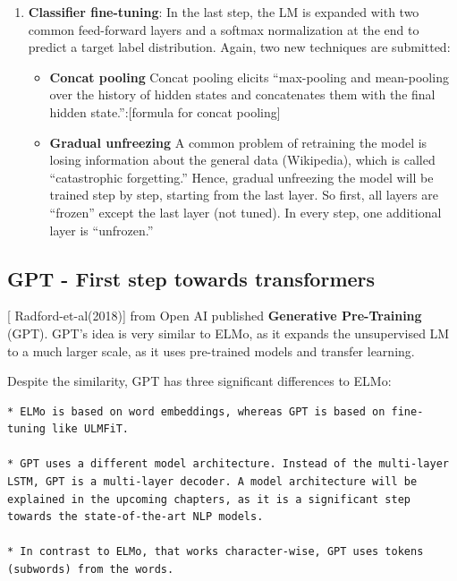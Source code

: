\documentclass[]{krantz}
\providecommand{\tightlist}{%
  \setlength{\itemsep}{0pt}\setlength{\parskip}{0pt}}
\begin{document}
\begin{enumerate}
\def\labelenumi{\arabic{enumi}.}
\setcounter{enumi}{2}
\tightlist
\item
  \textbf{Classifier fine-tuning}: In the last step, the LM is expanded with two common feed-forward layers and a softmax normalization at the end to predict a target label distribution. Again, two new techniques are submitted:

  \begin{itemize}
  \tightlist
  \item
    \textbf{Concat pooling}
    Concat pooling elicits ``max-pooling and mean-pooling over the history of hidden states and concatenates them with the final hidden state.'':{[}formula for concat pooling{]}
  \item
    \textbf{Gradual unfreezing}
    A common problem of retraining the model is losing information about the general data (Wikipedia), which is called ``catastrophic forgetting.'' Hence, gradual unfreezing the model will be trained step by step, starting from the last layer. So first, all layers are ``frozen'' except the last layer (not tuned). In every step, one additional layer is ``unfrozen.''
  \end{itemize}
\end{enumerate}

\hypertarget{gpt---first-step-towards-transformers}{%
\subsection{GPT - First step towards transformers}\label{gpt---first-step-towards-transformers}}

{[} Radford-et-al(2018){]} from Open AI published \textbf{Generative Pre-Training} (GPT). GPT's idea is very similar to ELMo, as it expands the unsupervised LM to a much larger scale, as it uses pre-trained models and transfer learning.

Despite the similarity, GPT has three significant differences to ELMo:

\begin{verbatim}
* ELMo is based on word embeddings, whereas GPT is based on fine-tuning like ULMFiT. 

* GPT uses a different model architecture. Instead of the multi-layer LSTM, GPT is a multi-layer decoder. A model architecture will be explained in the upcoming chapters, as it is a significant step towards the state-of-the-art NLP models. 

* In contrast to ELMo, that works character-wise, GPT uses tokens (subwords) from the words.
\end{verbatim}
\end{document}
